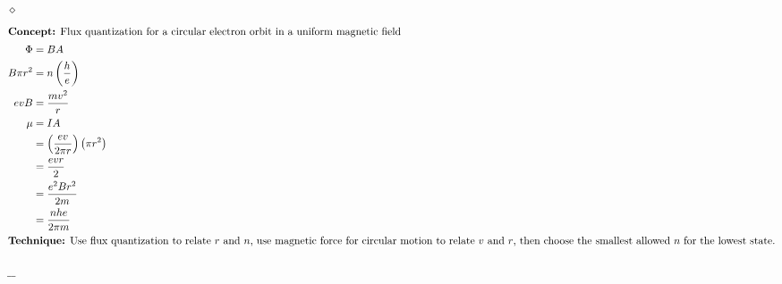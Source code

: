 \documentclass[preview, border={10mm, 5mm, 10mm, 10mm}]{standalone}
\title{\textsc{}}
\newenvironment{idea}{\par\noindent\color{violet!80!black}$\diamond$\enspace\ignorespaces}{\par}
\begin{document}
\begin{idea}
    \begin{align*}
    \intertext{\textbf{Concept:} Flux quantization for a circular electron orbit in a uniform magnetic field}
    \Phi &= BA \\
    B\pi r^2 &= n\left(\frac{h}{e}\right) \\
    evB &= \frac{mv^2}{r} \\
    \mu &= IA \\
    &= \left(\frac{ev}{2\pi r}\right)\left(\pi r^2\right) \\
    &= \frac{evr}{2} \\
    &= \frac{e^2Br^2}{2m} \\
    &= \frac{nhe}{2\pi m} \\
    \intertext{\textbf{Technique:} Use flux quantization to relate $r$ and $n$, use magnetic force for circular motion to relate $v$ and $r$, then choose the smallest allowed $n$ for the lowest state.}
    \end{align*}
\end{idea}
\hfill $\_\_$
\end{document}
